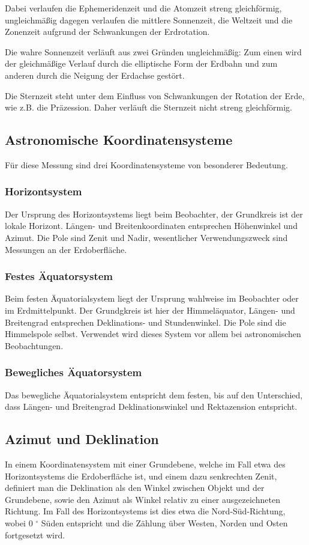 Dabei verlaufen die Ephemeridenzeit und die Atomzeit streng gleichförmig, ungleichmäßig dagegen verlaufen die mittlere Sonnenzeit, die Weltzeit und die Zonenzeit aufgrund der Schwankungen der Erdrotation.

Die wahre Sonnenzeit verläuft aus zwei Gründen ungleichmäßig: Zum einen wird der gleichmäßige Verlauf durch die elliptische Form der Erdbahn und zum anderen durch die Neigung der Erdachse gestört.

Die Sternzeit steht unter dem Einfluss von Schwankungen der Rotation der Erde, wie z.B. die Präzession. Daher verläuft die Sternzeit nicht streng gleichförmig.

\subsection{Astronomische Koordinatensysteme}
Für diese Messung sind drei Koordinatensysteme von besonderer Bedeutung.

\subsubsection{Horizontsystem}

Der Ursprung des Horizontsystems liegt beim Beobachter, der Grundkreis ist der lokale Horizont. Längen- und Breitenkoordinaten entsprechen Höhenwinkel und Azimut. Die Pole sind Zenit und Nadir, wesentlicher Verwendungszweck sind Messungen an der Erdoberfläche. 

\subsubsection{Festes Äquatorsystem}

Beim festen Äquatorialsystem liegt der Ursprung wahlweise im Beobachter oder im Erdmittelpunkt. Der Grundgkreis ist hier der Himmeläquator, Längen- und Breitengrad entsprechen Deklinations- und Stundenwinkel. Die Pole sind die Himmelspole selbst. Verwendet wird dieses System vor allem bei astronomischen Beobachtungen. 

\subsubsection{Bewegliches Äquatorsystem}

Das bewegliche Äquatorialsystem entspricht dem festen, bis auf den Unterschied, dass Längen- und Breitengrad Deklinationswinkel und Rektazension entspricht. 

\subsection{Azimut und Deklination}
In einem Koordinatensystem mit einer Grundebene, welche im Fall etwa des Horizontsystems die Erdoberfläche ist, und einem dazu senkrechten Zenit, definiert man die Deklination als den Winkel zwischen Objekt und der Grundebene, sowie den Azimut als Winkel relativ zu einer ausgezeichneten Richtung. Im Fall des Horizontsystems ist dies etwa die Nord-Süd-Richtung, wobei 0 $^\circ$ Süden entspricht und die Zählung über Westen, Norden und Osten fortgesetzt wird.  

